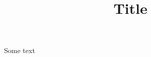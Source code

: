 \documentclass[man,12pt,a4paper,noextraspace,floatsintext,biblatex]{apa7}
\title{Title}
\begin{document}
\maketitle

\tableofcontents

Some text
\end{document}
